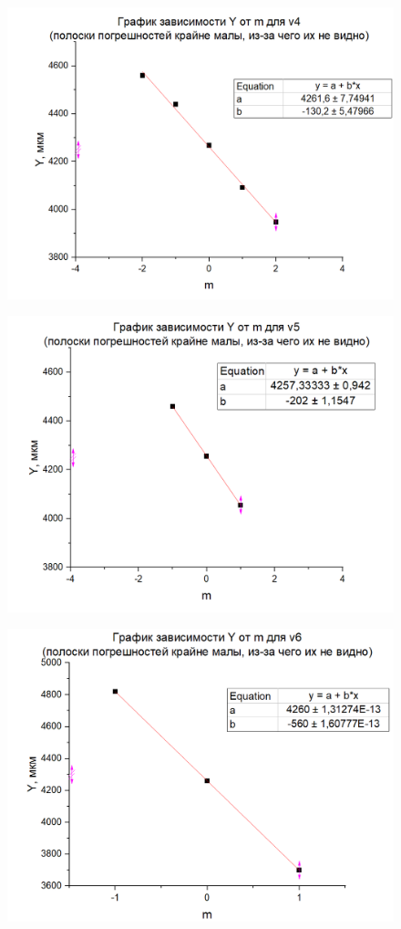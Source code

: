 \documentclass[a4paper,12pt]{article}
\begin{document}
\begin{figure}[H]
	\centering
	\includegraphics[width=0.8\linewidth]{graph4.png}
\end{figure}
\begin{figure}[H]
	\centering
	\includegraphics[width=0.8\linewidth]{graph5.png}
\end{figure}
\begin{figure}[H]
	\centering
	\includegraphics[width=0.8\linewidth]{graph6.png}
\end{figure}
\end{document}
